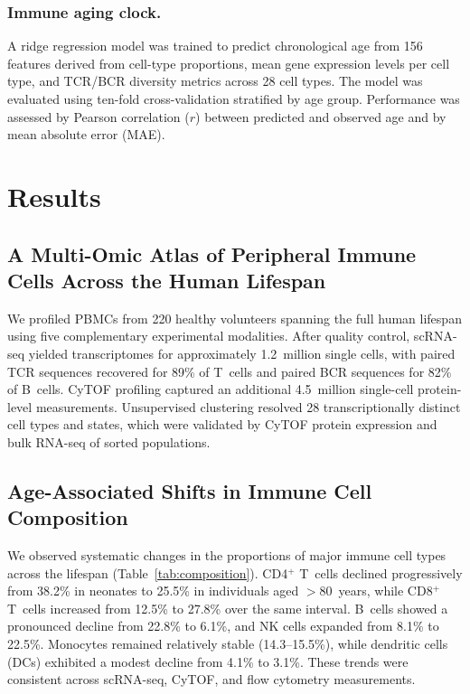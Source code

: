 \documentclass[11pt]{article}
\begin{document}
\subsubsection{Immune aging clock.}
A ridge regression model was trained to predict chronological age from 156 features derived from cell-type proportions, mean gene expression levels per cell type, and TCR/BCR diversity metrics across 28 cell types. The model was evaluated using ten-fold cross-validation stratified by age group. Performance was assessed by Pearson correlation ($r$) between predicted and observed age and by mean absolute error (MAE).

\section{Results}

\subsection{A Multi-Omic Atlas of Peripheral Immune Cells Across the Human Lifespan}

We profiled PBMCs from 220 healthy volunteers spanning the full human lifespan using five complementary experimental modalities. After quality control, scRNA-seq yielded transcriptomes for approximately 1.2~million single cells, with paired TCR sequences recovered for 89\% of T~cells and paired BCR sequences for 82\% of B~cells. CyTOF profiling captured an additional 4.5~million single-cell protein-level measurements. Unsupervised clustering resolved 28 transcriptionally distinct cell types and states, which were validated by CyTOF protein expression and bulk RNA-seq of sorted populations.

\subsection{Age-Associated Shifts in Immune Cell Composition}

We observed systematic changes in the proportions of major immune cell types across the lifespan (Table~\ref{tab:composition}). CD4$^+$ T~cells declined progressively from 38.2\% in neonates to 25.5\% in individuals aged $>$80~years, while CD8$^+$ T~cells increased from 12.5\% to 27.8\% over the same interval. B~cells showed a pronounced decline from 22.8\% to 6.1\%, and NK cells expanded from 8.1\% to 22.5\%. Monocytes remained relatively stable (14.3--15.5\%), while dendritic cells (DCs) exhibited a modest decline from 4.1\% to 3.1\%. These trends were consistent across scRNA-seq, CyTOF, and flow cytometry measurements.
\end{document}
